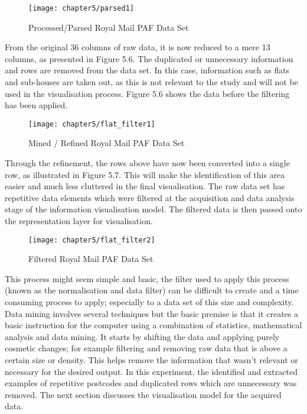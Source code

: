 \begin{figure}[H]
\centering
\texttt{[image: chapter5/parsed1]}
\caption{Processed/Parsed Royal Mail PAF Data Set}
\end{figure}

From the original 36 columns of raw data, it is now reduced to a mere 13 columns, as presented in Figure 5.6. The duplicated or unnecessary information and rows are removed from the data set. In this case, information such as flats and sub-houses are taken out, as this is not relevant to the study and will not be used in the visualisation process. Figure 5.6 shows the data before the filtering has been applied. 

\begin{figure}[H]
\centering
\texttt{[image: chapter5/flat\_filter1]}
\caption{Mined / Refined Royal Mail PAF Data Set}
\end{figure}

Through the refinement, the rows above have now been converted into a single row, as illustrated in Figure 5.7. This will make the identification of this area easier and much less cluttered in the final visualisation. The raw data set has repetitive data elements which were filtered at the acquisition and data analysis stage of the information visualisation model. The filtered data is then passed onto the representation layer for visualisation. 

\begin{figure}[H]
\centering
\texttt{[image: chapter5/flat\_filter2]}
\caption{Filtered Royal Mail PAF Data Set}
\end{figure}

This process might seem simple and basic, the filter used to apply this process (known as the normalisation and data filter) can be difficult to create and a time consuming process to apply; especially to a data set of this size and complexity. Data mining involves several techniques but the basic premise is that it creates a basic instruction for the computer using a combination of statistics, mathematical analysis and data mining. It starts by shifting the data and applying purely cosmetic changes; for example filtering and removing raw data that is above a certain size or density. This helps remove the information that wasn't relevant or necessary for the desired output. In this experiment, the identified and extracted examples of repetitive postcodes and duplicated rows which are unnecessary was removed. The next section discusses the visualisation model for the acquired data.

